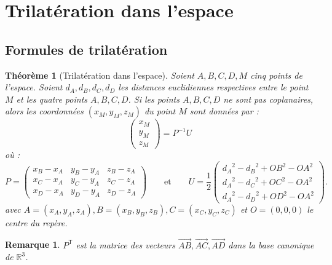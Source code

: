 \documentclass[french, a4paper, 12pt, parskip]{scrartcl}
\newtheorem{theorem}{Théorème}
\newtheorem*{remark}{Remarque}
\begin{document}
\section{Trilatération dans l'espace}
\label{sec:trilat-space}

\subsection{Formules de trilatération}
\label{subsec:trilat-space}

\begin{theorem}[Trilatération dans l'espace]
  Soient $A, B, C, D, M$ cinq points de l'espace. Soient $d_A, d_B, d_C, d_D$
  les distances euclidiennes respectives entre le point $M$ et les quatre
  points $A, B, C, D$. Si les points $A, B, C, D$ ne sont pas coplanaires,
  alors les coordonnées $(x_M, y_M, z_M)$ du point $M$ sont données par :
  \[
    \begin{pmatrix}x_M\\y_M\\z_M\end{pmatrix} = P^{-1}U 
  \]
  où :
  \[
    P = \begin{pmatrix}
      x_B-x_A & y_B-y_A & z_B-z_A \\
      x_C-x_A & y_C-y_A & z_C-z_A \\
      x_D-x_A & y_D-y_A & z_D-z_A
    \end{pmatrix}\qquad\text{et}\qquad U=\frac{1}{2}\begin{pmatrix}
      {d_A}^2 - {d_B}^2 + {OB}^2 - {OA}^2 \\ 
      {d_A}^2 - {d_C}^2 + {OC}^2 - {OA}^2 \\
      {d_A}^2 - {d_D}^2 + {OD}^2 - {OA}^2
    \end{pmatrix}.
  \]
  avec $A=(x_A, y_A, z_A), B=(x_B, y_B, z_B), C=(x_C, y_C, z_C)$ et $O=(0, 0,
  0)$ le centre du repère.
\end{theorem}

\begin{remark}
  $P^{\mathsf{T}}$ est la matrice des vecteurs $\overrightarrow{AB},
  \overrightarrow{AC}, \overrightarrow{AD}$ dans la base canonique de
  $\mathbb{R}^3$.
\end{remark}
\end{document}
